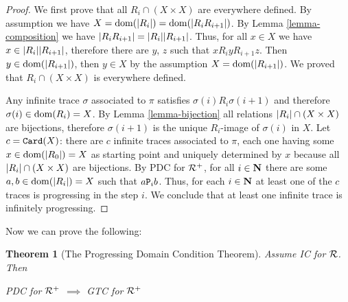 \documentclass{lmcs}
\newtheorem{theorem}{Theorem}[section]
\begin{document}
\begin{proof}
We first prove that all $R_i \cap (X \times X)$ are everywhere defined.
By assumption we have $X = {\rm dom}({| R_i |}) =  {\rm dom}({| R_iR_{i+1} |})$. By 
Lemma \ref{lemma-composition} we have ${| R_iR_{i+1} |} = {| R_i |} 
{| R_{i+1} |}$. Thus, for all $x \in X$ we have 
$x \in  {| R_i |} {| R_{i+1} |}$, 
therefore there are $y$, $z$ such that $x R_i y R_{i+1} z$. Then $y \in 
{\rm dom}({| R_{i+1} |})$, then $y \in X$ by the assumption $X = {\rm dom}({| R_{i+1} |})
$. We proved that $R_i \cap (X \times X)$ is everywhere defined. 

Any infinite trace $\sigma$ associated to $\pi$ satisfies $\sigma(i) R_i \sigma(i+1)$
and therefore $\sigma(i) \in {\rm dom}(R_i) = X$. By Lemma \ref{lemma-bijection} all relations 
${| R_i |} \cap (X \times X)$ are bijections, therefore $\sigma(i+1)$ is the
unique $R_i$-image of $\sigma(i)$ in $X$. Let $c = {\tt Card}(X)$: 
there are $c$ infinite traces associated to $\pi$, each one having some 
$x \in {\rm dom}({| R_0 |}) = X$ as starting point and uniquely determined by $x$ 
because all ${| R_i |} \cap (X \times X)$ are bijections. By 
PDC for ${\mathcal R}^+$, for all $i \in {\bf N}$ there are some $a,b \in {\rm dom}({| R_i |})=X$ such 
that $a {\tt P}_i b$. Thus, for each $i \in {\bf N}$ at least one of the $c$ traces is progressing
in the step $i$. 
We conclude that at least one infinite trace is infinitely progressing.
\end{proof}

Now we can prove the following:

\begin{theorem}[The Progressing Domain Condition Theorem]
\label{theorem-PDC}
Assume IC for ${\mathcal R}$. Then
\begin{center}
PDC for ${\mathcal R}^+$ $\implies$ GTC for ${\mathcal R}^+$
\end{center}
\end{theorem}
\end{document}
